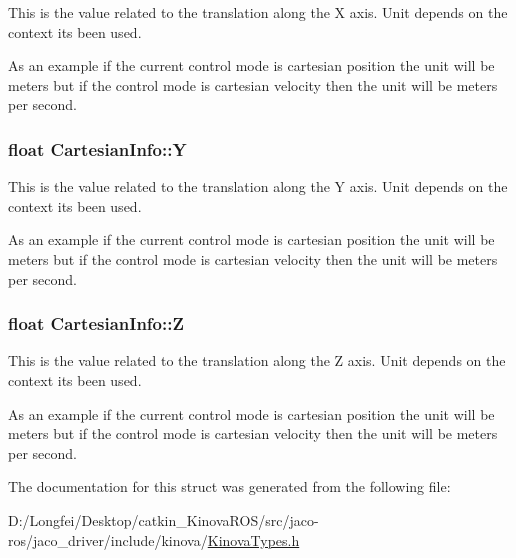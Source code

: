 This is the value related to the translation along the X axis. Unit depends on the context it\textquotesingle{}s been used. 

As an example if the current control mode is cartesian position the unit will be meters but if the control mode is cartesian velocity then the unit will be meters per second. 
\subsubsection[{\texorpdfstring{Y}{Y}}]{\setlength{\rightskip}{0pt plus 5cm}float Cartesian\+Info\+::Y}\hypertarget{structCartesianInfo_a12c2611c89445419b336e58815d87c7c}{}\label{structCartesianInfo_a12c2611c89445419b336e58815d87c7c}


This is the value related to the translation along the Y axis. Unit depends on the context it\textquotesingle{}s been used. 

As an example if the current control mode is cartesian position the unit will be meters but if the control mode is cartesian velocity then the unit will be meters per second. 
\subsubsection[{\texorpdfstring{Z}{Z}}]{\setlength{\rightskip}{0pt plus 5cm}float Cartesian\+Info\+::Z}\hypertarget{structCartesianInfo_a14e196e4cb38c0ae7f4658b9b070b7fe}{}\label{structCartesianInfo_a14e196e4cb38c0ae7f4658b9b070b7fe}


This is the value related to the translation along the Z axis. Unit depends on the context it\textquotesingle{}s been used. 

As an example if the current control mode is cartesian position the unit will be meters but if the control mode is cartesian velocity then the unit will be meters per second. 

The documentation for this struct was generated from the following file\+:\begin{DoxyCompactItemize}
\item 
D\+:/\+Longfei/\+Desktop/catkin\+\_\+\+Kinova\+R\+O\+S/src/jaco-\/ros/jaco\+\_\+driver/include/kinova/\hyperlink{KinovaTypes_8h}{Kinova\+Types.\+h}\end{DoxyCompactItemize}
